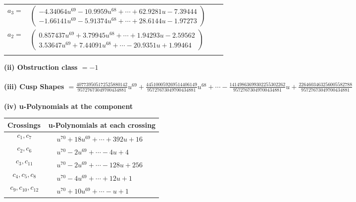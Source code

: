 \documentclass[1p]{elsarticle_modified}
\theoremstyle{definition}
\begin{document}
\begin{tabular}{m{7pt} m{180pt} m{7pt} m{180pt} }
\flushright $a_{3}=$&$\begin{pmatrix}-4.34064 u^{69}-10.9959 u^{68}+\cdots+62.9281 u-7.39444\\-1.66141 u^{69}-5.91374 u^{68}+\cdots+28.6144 u-1.97273\end{pmatrix}$ \\
\flushright $a_{2}=$&$\begin{pmatrix}0.857437 u^{69}+3.79945 u^{68}+\cdots+1.94293 u-2.59562\\3.53647 u^{69}+7.44091 u^{68}+\cdots-20.9351 u+1.99464\end{pmatrix}$\\&\end{tabular}
\flushleft \textbf{(ii) Obstruction class $= -1$}\\~\\
\flushleft \textbf{(iii) Cusp Shapes $= \frac{407739505172525880142}{95727673049700434881} u^{69}+\frac{445100059269514406149}{95727673049700434881} u^{68}+\cdots-\frac{14149863699302255302262}{95727673049700434881} u+\frac{2264603463256005582788}{95727673049700434881}$}\\~\\
\newpage\renewcommand{\arraystretch}{1}
\flushleft \textbf{(iv) u-Polynomials at the component}\newline \\
\begin{tabular}{m{50pt}|m{274pt}}
Crossings & \hspace{64pt}u-Polynomials at each crossing \\
\hline $$\begin{aligned}c_{1},c_{7}\end{aligned}$$&$\begin{aligned}
&u^{70}+18 u^{69}+\cdots+392 u+16
\end{aligned}$\\
\hline $$\begin{aligned}c_{2},c_{6}\end{aligned}$$&$\begin{aligned}
&u^{70}-2 u^{69}+\cdots-4 u+4
\end{aligned}$\\
\hline $$\begin{aligned}c_{3},c_{11}\end{aligned}$$&$\begin{aligned}
&u^{70}-2 u^{69}+\cdots-128 u+256
\end{aligned}$\\
\hline $$\begin{aligned}c_{4},c_{5},c_{8}\end{aligned}$$&$\begin{aligned}
&u^{70}-4 u^{69}+\cdots+12 u+1
\end{aligned}$\\
\hline $$\begin{aligned}c_{9},c_{10},c_{12}\end{aligned}$$&$\begin{aligned}
&u^{70}+10 u^{69}+\cdots- u+1
\end{aligned}$\\
\hline
\end{tabular}\\~\\
\end{document}

